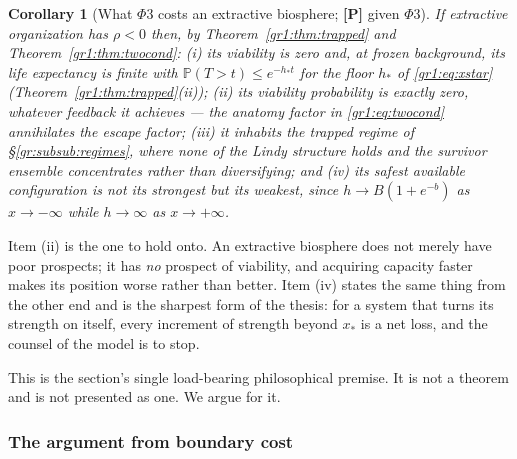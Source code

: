 \documentclass[11pt]{article}
\numberwithin{equation}{section}
\theoremstyle{plain}
\newtheorem{corollary}[theorem]{Corollary}
\theoremstyle{definition}
\theoremstyle{remark}
\newcommand{\PP}{\mathbb{P}}
\begin{document}
\begin{corollary}[What $\Phi3$ costs an extractive biosphere; \textbf{[P]}
given $\Phi3$]\label{gr:cor:extractcost}
If extractive organization has $\rho<0$ then, by
Theorem~\ref{gr1:thm:trapped} and Theorem~\ref{gr1:thm:twocond}:
\emph{(i)} its viability is zero and, at frozen background, its life
expectancy is finite with $\PP(T>t)\le e^{-h_\ast t}$ for the floor
$h_\ast$ of \eqref{gr1:eq:xstar} (Theorem~\ref{gr1:thm:trapped}(ii));
\emph{(ii)} its viability probability is \emph{exactly zero}, whatever
feedback it achieves --- the anatomy factor in \eqref{gr1:eq:twocond}
annihilates the escape factor;
\emph{(iii)} it inhabits the trapped regime of
\S\ref{gr:subsub:regimes}, where none of the Lindy structure holds and
the survivor ensemble concentrates rather than diversifying;
and \emph{(iv)} its safest available configuration is not its strongest
but its \emph{weakest}, since $h\to B(1+e^{-b})$ as $x\to-\infty$ while
$h\to\infty$ as $x\to+\infty$.
\end{corollary}

\noindent Item (ii) is the one to hold onto. An extractive biosphere
does not merely have poor prospects; it has \emph{no} prospect of
viability, and acquiring capacity faster makes its position worse rather
than better. Item (iv) states the same thing from the other end and is
the sharpest form of the thesis: for a system that turns its strength on
itself, every increment of strength beyond $x_\ast$ is a net loss, and
the counsel of the model is to stop.

This is the section's single load-bearing philosophical premise. It is
not a theorem and is not presented as one. We argue for it.

\subsubsection{The argument from boundary cost}\label{gr:subsub:boundary}
\end{document}
